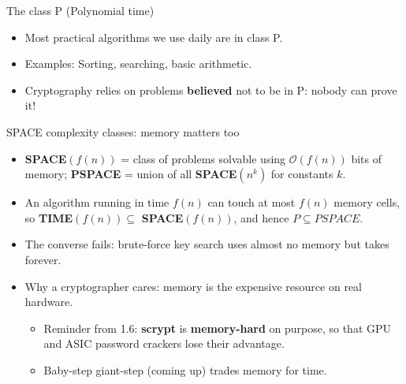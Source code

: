 \ifdefined\PRESENTATION\else\PassOptionsToClass{handout}{beamer}\fi\documentclass[aspectratio=169, lualatex]{beamer}
\begin{document}
\begin{frame}{The class P (Polynomial time)}
	\begin{itemize}[<+->]
		\item Most practical algorithms we use daily are in class P.
		\item Examples: Sorting, searching, basic arithmetic.
		\item Cryptography relies on problems \textbf{believed} not to be in P: nobody can prove it!
	\end{itemize}
\end{frame}

\begin{frame}{SPACE complexity classes: memory matters too}
	\begin{itemize}[<+->]
		\item \textbf{SPACE}$(f(n))$ = class of problems solvable using $\mathcal{O}(f(n))$ bits of memory; \textbf{PSPACE} = union of all \textbf{SPACE}$(n^k)$ for constants $k$.
		\item An algorithm running in time $f(n)$ can touch at most $f(n)$ memory cells, so \textbf{TIME}$(f(n)) \subseteq$ \textbf{SPACE}$(f(n))$, and hence $P \subseteq PSPACE$.
		\item The converse fails: brute-force key search uses almost no memory but takes forever.
		\item Why a cryptographer cares: memory is the expensive resource on real hardware.
		      \begin{itemize}
			      \item Reminder from 1.6: \textbf{scrypt} is \textbf{memory-hard} on purpose, so that GPU and ASIC password crackers lose their advantage.
			      \item Baby-step giant-step (coming up) trades memory for time.
		      \end{itemize}
	\end{itemize}
\end{frame}
\end{document}
